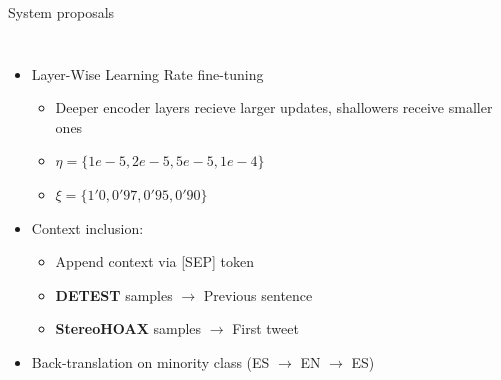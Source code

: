 \begin{frame}{System proposals}
     {
    \begin{columns}
    \begin{itemize}
        \item Layer-Wise Learning Rate fine-tuning
        \begin{itemize}
            \item Deeper encoder layers recieve larger updates, shallowers receive smaller ones
            \item $\eta = \{1e-5, 2e-5, 5e-5, 1e-4\}$
            \item $\xi = \{1'0, 0'97, 0'95, 0'90\}$
        \end{itemize}
        \item Context inclusion:
        \begin{itemize}
            \item Append context via [SEP] token
            \item \textbf{DETEST} samples $\rightarrow$ Previous sentence
            \item \textbf{StereoHOAX} samples $\rightarrow$ First tweet
        \end{itemize}
        \item Back-translation on minority class (ES $\rightarrow$ EN $\rightarrow$ ES)
    \end{itemize}

    \centering
    
    \end{columns}
    }
\end{frame}


